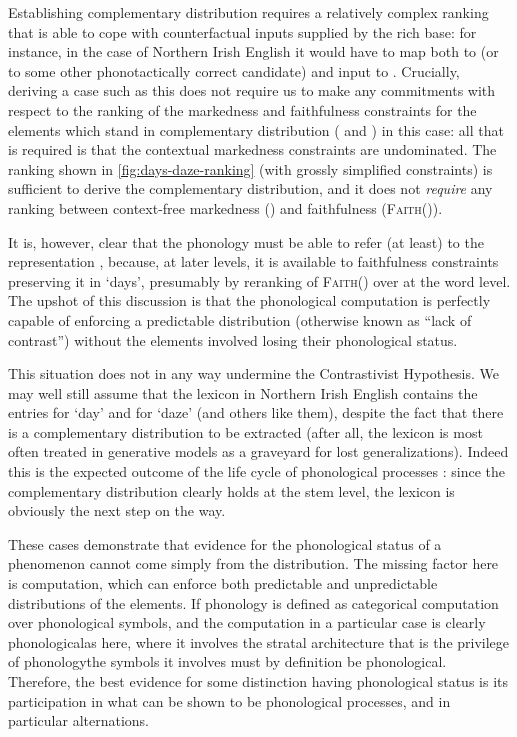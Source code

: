 Establishing complementary distribution requires a relatively complex ranking that is able to cope with counterfactual inputs supplied by the rich base: for instance, in the case of Northern Irish English it would have to map both  to \ipa{[ˈdɛː]} (or to some other phonotactically correct candidate) and input  to \ipa{[ˈdɪəz]}. Crucially, deriving a case such as this does not require us to make any commitments with respect to the ranking of the markedness and faithfulness constraints for the elements which stand in complementary distribution (\ipa{[ɛː]} and \ipa{[ɪə]}) in this case: all that is required is that the contextual markedness constraints are undominated. The ranking shown in \cref{fig:days-daze-ranking} (with grossly simplified constraints) is sufficient to derive the complementary distribution, and it does not \emph{require} any ranking between context\hyp free markedness () and faithfulness (\textsc{Faith}()).

It is, however, clear that the phonology must be able to refer (at least) to the representation \ipa{[ɛː]}, because, at later levels, it is available to faithfulness constraints preserving it in \ipa{[ˈdɛːz]} `days', presumably by reranking of \textsc{Faith}() over  at the word level. The upshot of this discussion is that the phonological computation is perfectly capable of enforcing a predictable distribution (otherwise known as \enquote{lack of contrast}) without the elements involved losing their phonological status.

This situation does not in any way undermine the Contrastivist Hypothesis. We may well still assume that the lexicon in Northern Irish English contains the entries  for `day' and  for `daze' (and others like them), despite the fact that there is a complementary distribution to be extracted (after all, the lexicon is most often treated in generative models as a graveyard for lost generalizations). Indeed this is the expected outcome of the life cycle of phonological processes \citep{bermudez-diachr,kaisse11:_lexic_phonol,bermudez-oterong:_cycles}: since the complementary distribution clearly holds at the stem level, the lexicon is obviously the next step on the way.

These cases demonstrate that evidence for the phonological status of a phenomenon cannot come simply from the distribution. The missing factor here is computation, which can enforce both predictable and unpredictable distributions of the elements. If phonology is defined as categorical computation over phonological symbols, and the computation in a particular case is clearly phonological\dash as here, where it involves the stratal architecture that is the privilege of phonology\dash the symbols it involves must by definition be phonological. Therefore, the best evidence for some distinction having phonological status is its participation in what can be shown to be phonological processes, and in particular alternations.

